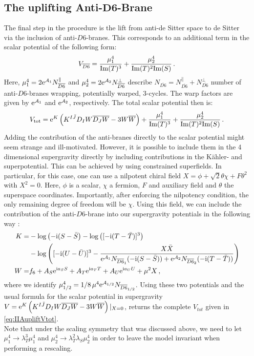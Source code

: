 \documentclass[a4paper,12pt]{report}
\newcommand{\be}{\begin{equation}}
\newcommand{\ee}{\end{equation}}
\newcommand{\bea}{\begin{equation}\begin{aligned}}
\newcommand{\eea}{\end{aligned}\end{equation}}
\def\rmi{{\rm i}}
\def\rme{{\rm e}}
\def\rmim{{\rm Im}}
\begin{document}
\subsection[The uplifting Anti-$D6$-Brane]{The uplifting Anti-$\mathbf{D6}$-Brane}
The final step in the procedure is the lift from anti-de Sitter space to de Sitter via the inclusion of anti-$D6$-branes. This corresponds to an additional term in the scalar potential of the following form:
\be 
V_{\overline{D6}} = \frac{\mu_1^4}{\rmim (T)^3} + \frac{\mu_2^4}{\rmim(T)^2\rmim(S)}\,.
\ee
Here, $\mu_1^4 = 2 \rme^{\mathcal{A}_1} N_{\overline{D6}}^\parallel$ and $\mu_2^4 = 2 \rme^{\mathcal{A}_2} N_{\overline{D6}}^\perp$ describe $N_{\overline{D6}} = N_{\overline{D6}}^\parallel + N_{\overline{D6}}^\perp$ number of anti-$D6$-branes wrapping, potentially warped, 3-cycles. The warp factors are given by $\rme^{\mathcal{A}_1}$ and $\rme^{\mathcal{A}_2}$, respectively. The total scalar potential then is:
\be 
V_{\text{tot}} = \rme^K \left( K^{I\bar{J}} D_{I}W \overline{D_{J} W} - 3 W \overline{W} \right) + \frac{\mu_1^4}{\rmim (T)^3} + \frac{\mu_2^4}{\rmim(T)^2\rmim(S)}\,.
\label{eq:IIAupliftVtot}
\ee
Adding the contribution of the anti-branes directly to the scalar potential might seem strange and ill-motivated. However, it is possible to include them in the 4 dimensional supergravity directly by including contributions in the Kähler- and superpotential. This can be achieved by using constrained superfields. In particular, for this case, one can use a nilpotent chiral field $X = \phi + \sqrt{2} \theta \chi + F \theta^2$ with $X^2=0$. Here, $\phi$ is a scalar, $\chi$ a fermion, $F$ and auxiliary field and $\theta$ the superspace coordinates. Importantly, after enforcing the nilpotency condition, the only remaining degree of freedom will be $\chi$. Using this field, we can include the contribution of the anti-$D6$-brane into our supergravity potentials in the following way \cite{Kallosh:2018nrk}:
\bea 
K = &- \log \left( -\rmi(S-\bar{S}\right) -  \log \left( [-\rmi (T-\bar{T})]^3\right) \\&- \log \left( [-\rmi(U-\bar{U})]^3 - \frac{X \bar{X}}{\rme^{\mathcal{A}_1} N_{\overline{D6}_1} (-\rmi (S-\bar{S})) +\rme^{\mathcal{A}_2} N_{\overline{D6}_2} (-\rmi (T-\bar{T}))}\right)\\
W = &f_6 + A_S \rme^{\rmi a_S S}+ A_T \rme^{\rmi a_T T}+ A_U \rme^{\rmi a_U U} + \mu^2 X\,,
\eea 
where we identify $\mu^4_{1/2} = 1/8\,\mu^4 \rme^{\mathcal{A}_{1/2}} N_{\overline{D6}_{1/2}}$.
Using these two potentials and the usual formula for the scalar potential in supergravity $V = \rme^K \left( K^{I\bar{J}} D_{I}W \overline{D_{J} W} - 3 W \overline{W} \right)|_{X=0}$, returns the complete $V_{tot}$ given in \eqref{eq:IIAupliftVtot}. \\
Note that under the scaling symmetry that was discussed above, we need to let $ \mu_1^4 \to \lambda_T^3 \mu_1^4 $ and $\mu_2^4 \to \lambda_T^2 \lambda_S\mu_2^4 $ in order to leave the model invariant when performing a rescaling.
\end{document}
